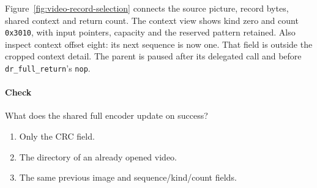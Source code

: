 Figure~\ref{fig:video-record-selection} connects the source picture, record bytes,
shared context and return count. The context view shows kind zero and count
\texttt{0x3010}, with input pointers, capacity and the reserved pattern retained.
Also inspect context offset eight: its next sequence is now one. That field is
outside the cropped context detail. The parent is paused after its delegated call
and before \texttt{dr\_full\_return}'s \texttt{nop}.


\clearpage

\paragraph{Check} What does the shared full encoder update on success?
\begin{enumerate}[label=\Alph*.]
  \item Only the CRC field.
  \item The directory of an already opened video.
  \item The same previous image and sequence/kind/count fields.
\end{enumerate}
